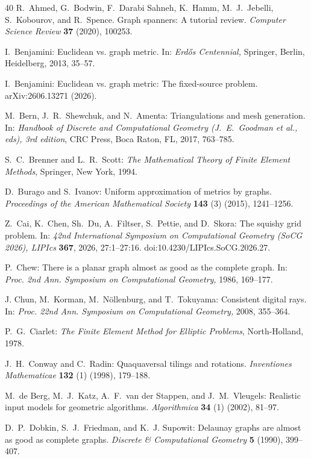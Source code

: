 \documentclass[12pt]{article}
\theoremstyle{plain}
\theoremstyle{definition}
\theoremstyle{remark}
\begin{document}
\begin{thebibliography}{40}
R.~Ahmed, G.~Bodwin, F.~Darabi Sahneh, K.~Hamm, M.~J.~Jebelli, S.~Kobourov, and R.~Spence. Graph spanners: A tutorial review. \emph{Computer Science Review} \textbf{37} (2020), 100253.

I.~Benjamini: Euclidean vs. graph metric. In: \emph{Erd\H os Centennial,} Springer, Berlin, Heidelberg, 2013, 35--57.

I.~Benjamini: Euclidean vs. graph metric: The fixed-source problem. arXiv:2606.13271 (2026).

M.~Bern, J.~R.~Shewchuk, and N.~Amenta: Triangulations and mesh generation. In: \emph{Handbook of Discrete and Computational Geometry
(J.~E.~Goodman et al., eds), 3rd edition}, CRC Press, Boca Raton, FL, 2017, 763--785.

S.~C.~Brenner and L.~R.~Scott: \emph{The Mathematical Theory of Finite Element Methods}, Springer, New York, 1994.

D.~Burago and S.~Ivanov: Uniform approximation of metrics by graphs. \emph{Proceedings of the American Mathematical Society} \textbf{143} (3) (2015), 1241--1256.

Z.~Cai, K.~Chen, Sh.~Du, A.~Filtser, S.~Pettie, and D.~Skora:
The squishy grid problem. In: \emph{42nd International Symposium on Computational Geometry (SoCG 2026), LIPIcs} \textbf{367}, 2026, 27:1--27:16.
doi:10.4230/LIPIcs.SoCG.2026.27.
  
P.~Chew: There is a planar graph almost as good as the complete graph. In: \emph{ Proc. 2nd Ann. Symposium on Computational Geometry,} 1986, 169--177.

J. Chun, M.~Korman, M.~Nöllenburg, and T.~Tokuyama: Consistent digital rays. In: \emph{Proc. 22nd Ann. Symposium on Computational Geometry,} 2008, 355--364.

 P.~G.~Ciarlet: \emph{The \textit{Finite }Element Method for Elliptic Problems}, North-Holland, 1978.

J.~H.~Conway and C.~Radin: Quaquaversal tilings and rotations. \emph{Inventiones Mathematicae} \textbf{132} (1) (1998), 179--188.

M.~de Berg, M.~J.~Katz, A.~F.~van der Stappen, and J.~M.~Vleugels: Realistic input models for geometric algorithms. \emph{Algorithmica} \textbf{34} (1) (2002), 81--97.

D.~P.~Dobkin, S.~J.~Friedman, and K.~J. Supowit: Delaunay graphs are almost as good as complete graphs. \emph{Discrete \& Computational Geometry} \textbf{5} (1990), 399--407.


\end{thebibliography}
\end{document}
